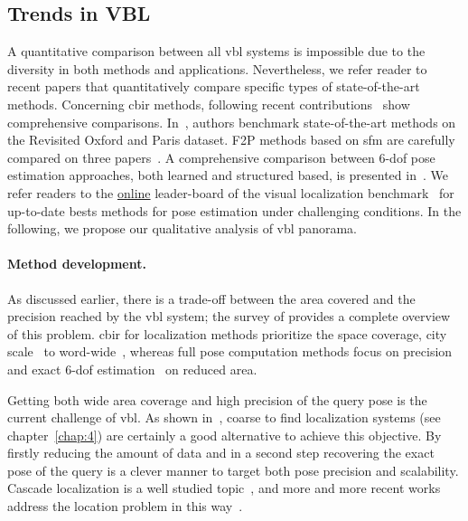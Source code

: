	\subsection{Trends in VBL}
		\label{subsec:qualitative_comparison}
    	
		A quantitative comparison between all \ac{vbl} systems is impossible due to the diversity in both methods and applications. Nevertheless, we refer reader to recent papers that quantitatively compare specific types of state-of-the-art methods. Concerning \ac{cbir} methods, following recent contributions~\citep{Radenovic2016,Gordo2016} show comprehensive comparisons. In~\citep{Radenovic2018}, authors benchmark state-of-the-art methods on the Revisited Oxford and Paris dataset. F2P methods based on \ac{sfm} are carefully compared on three papers~\citep{Feng2016a,Sattler2016a,Svarm2016}. A comprehensive comparison between 6-\ac{dof} pose estimation approaches, both learned and structured based, is presented in~\citep{Sattler2019}. We refer readers to the \href{https://www.visuallocalization.net/benchmark/}{online} leader-board of the visual localization benchmark~\citep{Sattler2018} for up-to-date bests methods for pose estimation under challenging conditions. In the following, we propose our qualitative analysis of \ac{vbl} panorama. 
        

        \paragraph{Method development.}
        	As discussed earlier, there is a trade-off between the area covered and the precision reached by the \ac{vbl} system; the survey of \citet{Brejcha2017} provides a complete overview of this problem. \ac{cbir} for localization methods prioritize the space coverage, city scale~\citep{Gordo2016} to word-wide~\citep{Vo2017}, whereas full pose computation methods focus on precision and exact 6-\ac{dof} estimation~\citep{Feng2016a} on reduced area. 

	        Getting both wide area coverage and high precision of the query pose is the current challenge of \ac{vbl}. As shown in~\citep{Sattler2017}, coarse to find localization systems (see chapter~\ref{chap:4}) are certainly a good alternative to achieve this objective. By firstly reducing the amount of data and in a second step recovering the exact pose of the query is a clever manner to target both pose precision and scalability. Cascade localization is a well studied topic~\citep{Rubio2015,Azzi2016,Song2016,Meng2016,Sattler2017}, and more and more recent works address the location problem in this way~\citep{Sarlin2018a,Sarlin2018,Germain2019}.
     
